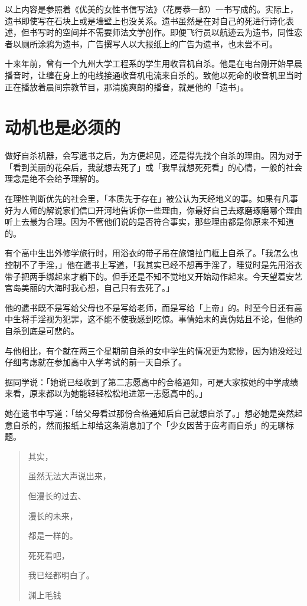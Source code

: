 \documentclass[UTF8]{ctexart}
\begin{document}
\bigbreak

以上内容是参照着《优美的女性书信写法》（花房恭一郎）一书写成的。实际上，遗书即使写在石块上或是墙壁上也没关系。遗书虽然是在对自己的死进行诗化表述，但书写时的空间并不需要师法文学创作。即便飞行员以航迹云为遗书，同性恋者以厕所涂鸦为遗书，广告撰写人以大报纸上的广告为遗书，也未尝不可。

十来年前，曾有一个九州大学工程系的学生用收音机自杀。他是在电台刚开始早晨播音时，让缠在身上的电线接通收音机电流来自杀的。致他以死命的收音机里当时正在播放着晨间宗教节目，那清脆爽朗的播音，就是他的「遗书」。

\section{动机也是必须的}

做好自杀机器，会写遗书之后，为方便起见，还是得先找个自杀的理由。因为对于「看到美丽的花朵后，我就想去死了」或「我早就想死死看」的心情，一般的社会理念是绝不会给予理解的。

在理性判断优先的社会里，「本质先于存在」被公认为天经地义的事。如果有凡事好为人师的解说家们信口开河地告诉你一些理由，你最好自己去琢磨琢磨哪个理由听上去最为合理。因为不管他们说的是否符合事实，那些理由都是你原来不知道的。

有个高中生出外修学旅行时，用浴衣的带子吊在旅馆拉门框上自杀了。「我怎么也控制不了手淫，」他在遗书上写道，「我其实已经不想再手淫了，睡觉时是先用浴衣带子把两手绑起来才躺下的。但手还是不知不觉地又开始动作起来。今天望着安艺宫岛美丽的大海时我心想，自己只有去死了。」

他的遗书既不是写给父母也不是写给老师，而是写给「上帝」的。时至今日还有高中生将手淫视为犯罪，这不能不使我感到吃惊。事情始末的真伪姑且不论，但他的自杀到底是可悲的。

与他相比，有个就在两三个星期前自杀的女中学生的情况更为悲惨，因为她没经过仔细考虑就在参加高中入学考试的前一天自杀了。

据同学说：「她说已经收到了第二志愿高中的合格通知，可是大家按她的中学成绩来看，原来都以为她能轻轻松松地进第一志愿高中的。」

她在遗书中写道：「给父母看过那份合格通知后自己就想自杀了。」想必她是突然起意自杀的，然而报纸上却给这条消息加了个「少女因苦于应考而自杀」的无聊标题。

\newpage

\begin{verse}
其实，

虽然无法大声说出来，

但漫长的过去、

漫长的未来，

都是一样的。

死死看吧，

我已经都明白了。

渊上毛钱
\end{verse}
\end{document}
